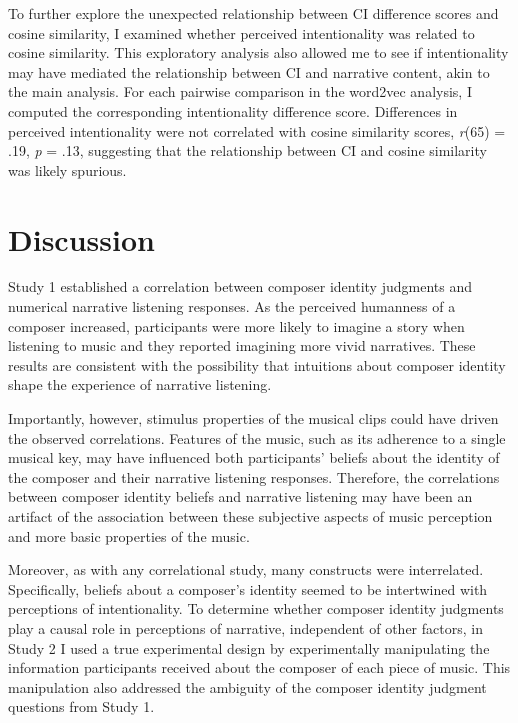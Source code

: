 \documentclass[12pt,twoside]{reedthesis}
\begin{document}
To further explore the unexpected relationship between CI difference scores and cosine similarity, I examined whether perceived intentionality was related to cosine similarity. This exploratory analysis also allowed me to see if intentionality may have mediated the relationship between CI and narrative content, akin to the main analysis. For each pairwise comparison in the word2vec analysis, I computed the corresponding intentionality difference score. Differences in perceived intentionality were not correlated with cosine similarity scores, \emph{r}(65) = .19, \emph{p} = .13, suggesting that the relationship between CI and cosine similarity was likely spurious.

\section*{Discussion}

Study 1 established a correlation between composer identity judgments and numerical narrative listening responses. As the perceived humanness of a composer increased, participants were more likely to imagine a story when listening to music and they reported imagining more vivid narratives. These results are consistent with the possibility that intuitions about composer identity shape the experience of narrative listening.

Importantly, however, stimulus properties of the musical clips could have driven the observed correlations. Features of the music, such as its adherence to a single musical key, may have influenced both participants’ beliefs about the identity of the composer and their narrative listening responses. Therefore, the correlations between composer identity beliefs and narrative listening may have been an artifact of the association between these subjective aspects of music perception and more basic properties of the music.

Moreover, as with any correlational study, many constructs were interrelated. Specifically, beliefs about a composer’s identity seemed to be intertwined with perceptions of intentionality. To determine whether composer identity judgments play a causal role in perceptions of narrative, independent of other factors, in Study 2 I used a true experimental design by experimentally manipulating the information participants received about the composer of each piece of music. This manipulation also addressed the ambiguity of the composer identity judgment questions from Study 1. 
\end{document}
